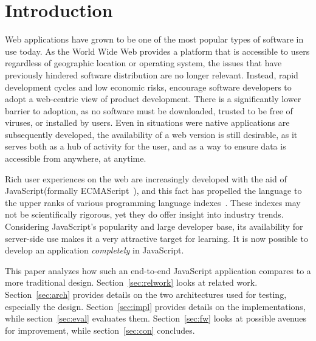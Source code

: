 \section{\label{sec:intro}Introduction}

Web applications have grown to be one of the most popular types of software in use today. As the World Wide Web provides a platform that is accessible to users regardless of geographic location or operating system, the issues that have previously hindered software distribution are no longer relevant. Instead, rapid development cycles and low economic risks, encourage software developers to adopt a web-centric view of product development. There is a significantly lower barrier to adoption, as no software must be downloaded, trusted to be free of viruses, or installed by users. Even in situations were native applications are subsequently developed, the availability of a web version is still desirable, as it serves both as a hub of activity for the user, and as a way to ensure data is accessible from anywhere, at anytime.

Rich user experiences on the web are increasingly developed with the aid of JavaScript(formally ECMAScript~\cite{ecmascriptiso}), and this fact has propelled the language to the upper ranks of various programming language indexes~\cite{ghstats}\cite{tlpi}\cite{tiobe}. These indexes may not be scientifically rigorous, yet they do offer insight into industry trends. Considering JavaScript's popularity and large developer base, its availability for server-side use makes it a very attractive target for learning. It is now possible to develop an application \emph{completely} in JavaScript.

This paper analyzes how such an end-to-end JavaScript application compares to a more traditional design. Section~\ref{sec:relwork} looks at related work. Section~\ref{sec:arch} provides details on the two architectures used for testing, especially the design. Section~\ref{sec:impl} provides details on the implementations, while section~\ref{sec:eval} evaluates them. Section~\ref{sec:fw} looks at possible avenues for improvement, while section~\ref{sec:con} concludes.